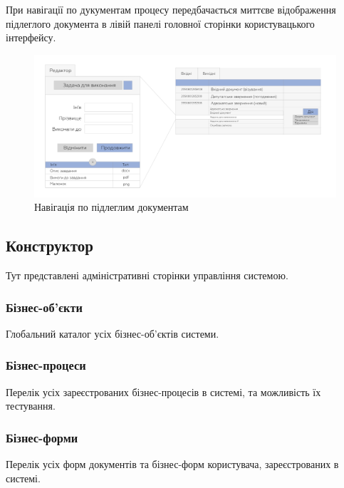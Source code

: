При навігації по дукументам процесу передбачається миттєве відображення підлеглого
документа в лівій панелі головної сторінки користувацького інтерфейсу.

\begin{figure}[!htbp]
\centerline{\includegraphics[scale=0.4]{searchBpe.png}}
\caption{Навігація по підлеглим документам}
\end{figure}

\newpage
\subsection{Конструктор}

Тут представлені адміністративні сторінки управління системою.

\subsubsection{Бізнес-об'єкти}

Глобальний каталог усіх бізнес-об'єктів системи.

\subsubsection{Бізнес-процеси}

Перелік усіх зареєстрованих бізнес-процесів в системі, та можливість їх тестування.

\subsubsection{Бізнес-форми}

Перелік усіх форм документів та бізнес-форм користувача, зареєстрованих в системі.



